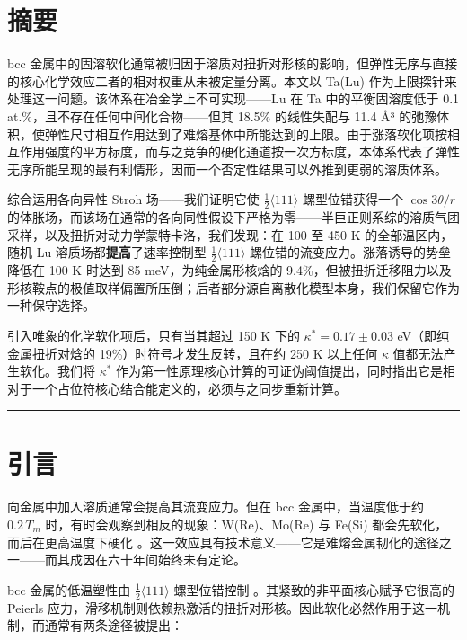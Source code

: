 
\hypertarget{ux6458ux8981}{%
\section*{摘要}\label{sec:ux6458ux8981}}

bcc 金属中的固溶软化通常被归因于溶质对扭折对形核的影响，但弹性无序与直接的核心化学效应二者的相对权重从未被定量分离。本文以 Ta(Lu) 作为上限探针来处理这一问题。该体系在冶金学上不可实现------Lu 在 Ta 中的平衡固溶度低于 0.1 at.\%，且不存在任何中间化合物------但其 18.5\% 的线性失配与 11.4 Å³ 的弛豫体积，使弹性尺寸相互作用达到了难熔基体中所能达到的上限。由于涨落软化项按相互作用强度的平方标度，而与之竞争的硬化通道按一次方标度，本体系代表了弹性无序所能呈现的最有利情形，因而一个否定性结果可以外推到更弱的溶质体系。

综合运用各向异性 Stroh 场------我们证明它使 \(\tfrac12\langle111\rangle\) 螺型位错获得一个 \(\cos3\theta/r\) 的体胀场，而该场在通常的各向同性假设下严格为零------半巨正则系综的溶质气团采样，以及扭折对动力学蒙特卡洛，我们发现：在 100 至 450 K 的全部温区内，随机 Lu 溶质场都\textbf{提高}了速率控制型 \(\tfrac12\langle111\rangle\) 螺位错的流变应力。涨落诱导的势垒降低在 100 K 时达到 85 meV，为纯金属形核焓的 9.4\%，但被扭折迁移阻力以及形核鞍点的极值取样偏置所压倒；后者部分源自离散化模型本身，我们保留它作为一种保守选择。

引入唯象的化学软化项后，只有当其超过 150 K 下的 \(\kappa^* = 0.17 \pm 0.03\) eV（即纯金属扭折对焓的 19\%）时符号才发生反转，且在约 250 K 以上任何 \(\kappa\) 值都无法产生软化。我们将 \(\kappa^*\) 作为第一性原理核心计算的可证伪阈值提出，同时指出它是相对于一个占位符核心结合能定义的，必须与之同步重新计算。

\begin{center}\rule{0.5\linewidth}{0.5pt}\end{center}

\hypertarget{ux5f15ux8a00}{%
\section{引言}\label{sec:ux5f15ux8a00}}

向金属中加入溶质通常会提高其流变应力。但在 bcc 金属中，当温度低于约 \(0.2\,T_m\) 时，有时会观察到相反的现象：W(Re)、Mo(Re) 与 Fe(Si) 都会先软化，而后在更高温度下硬化 \cite{christian1983}。这一效应具有技术意义------它是难熔金属韧化的途径之一------而其成因在六十年间始终未有定论。

bcc 金属的低温塑性由 \(\tfrac12\langle111\rangle\) 螺型位错控制 \cite{hirth1982,dezerald2014}。其紧致的非平面核心赋予它很高的 Peierls 应力，滑移机制则依赖热激活的扭折对形核。因此软化必然作用于这一机制，而通常有两条途径被提出：

